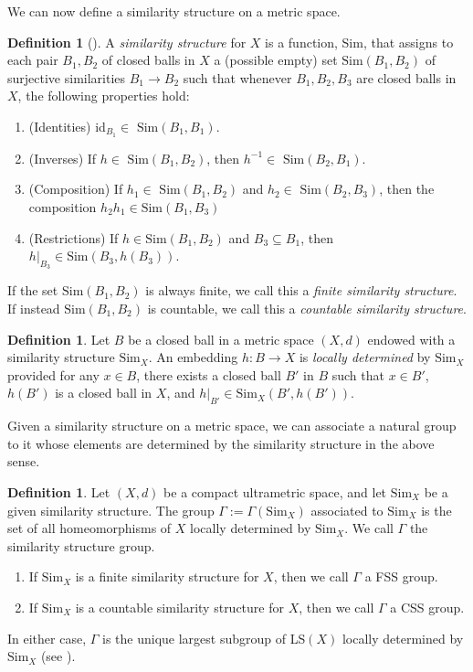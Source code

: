 \documentclass[12pt]{amsart}
\numberwithin{equation}{subsection}
\theoremstyle{definition}
\theoremstyle{definition}
\newtheorem{definition}[theorem]{Definition}
\theoremstyle{remark}
\begin{document}
We can now define a similarity structure on a metric space.

\begin{definition}[\cite{hughes2009}]
    A \textit{similarity structure} for $X$ is a function, Sim, that assigns to each pair $B_1, B_2$ of closed balls in $X$ a (possible empty) set $\text{Sim}(B_1,B_2)$ of surjective similarities $B_1 \rightarrow B_2$ such that whenever $B_1, B_2, B_3$ are closed balls in $X$, the following properties hold:
    \begin{enumerate}
        \item (Identities) id$_{B_1} \in$ $\text{Sim}(B_1,B_1)$.
        \item (Inverses) If $h \in$ $\text{Sim}(B_1,B_2)$, then $h^{-1} \in$ $\text{Sim}(B_2,B_1)$.
        \item (Composition) If $h_1 \in$ $\text{Sim}(B_1,B_2)$ and $h_2 \in$ $\text{Sim}(B_2,B_3)$, then the composition $h_2h_1 \in \text{Sim}(B_1,B_3)$
        \item (Restrictions) If $h \in \text{Sim}(B_1,B_2)$ and $B_3 \subseteq B_1$, then $h\vert_{B_3} \in \text{Sim}(B_3,h(B_3))$. 
    \end{enumerate}
    If the set $\text{Sim}(B_1,B_2)$ is always finite, we call this a \textit{finite similarity structure}. If instead $\text{Sim}(B_1,B_2)$ is countable, we call this a \textit{countable similarity structure}. 
\end{definition}

\begin{definition}
Let $B$ be a closed ball in a metric space $(X,d)$ endowed with a similarity structure $\text{Sim}_{X}$. An embedding $h : B \to X$ is \textit{locally determined} by $\text{Sim}_{X}$ provided for any $x \in B$, there exists a closed ball $B'$ in $B$ such that $x \in B'$, $h(B')$ is a closed ball in $X$, and $h\vert_{B'} \in \text{Sim}_{X}(B',h(B'))$.  
\end{definition}

Given a similarity structure on a metric space, we can associate a natural group to it whose elements are determined by the similarity structure in the above sense.

\begin{definition}\label{def:CSS}
Let $(X,d)$ be a compact ultrametric space, and let $\text{Sim}_{X}$ be a given similarity structure. The group $\Gamma := \Gamma (\text{Sim}_{X})$ associated to $\text{Sim}_{X}$ is the set of all homeomorphisms of $X$ locally determined by $\text{Sim}_{X}$. We call $\Gamma$ the similarity structure group.
\begin{enumerate}
    \item If $\text{Sim}_X$ is a finite similarity structure for $X$, then we call $\Gamma$ a FSS group.
    \item If $\text{Sim}_X$ is a countable similarity structure for $X$, then we call $\Gamma$ a CSS group.
\end{enumerate}
In either case, $\Gamma$ is the unique largest subgroup of LS$(X)$ locally determined by $\text{Sim}_X$ (see \cite[Proposition 3.5]{hughes2009}).
\end{definition}
\end{document}
